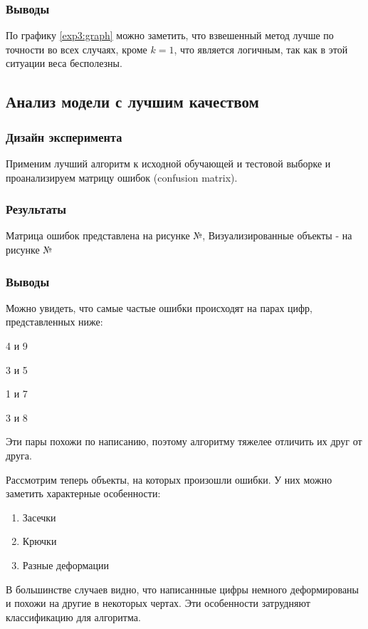 \documentclass[a4paper, 12pt]{article}
\begin{document}
    \subsubsection{Выводы}
    По графику \ref{exp3:graph} можно заметить, что взвешенный метод лучше по точности во всех случаях, кроме $k = 1$, что является логичным, так как в этой ситуации веса бесполезны.
    \subsection{Анализ модели с лучшим качеством}
    \subsubsection{Дизайн эксперимента}
    Применим лучший алгоритм к исходной обучающей и тестовой выборке и проанализируем матрицу ошибок (confusion matrix).
    \subsubsection{Результаты}
    Матрица ошибок представлена на рисунке №, Визуализированные объекты - на рисунке №
    \subsubsection{Выводы}
    Можно увидеть, что самые частые ошибки происходят на парах цифр, представленных ниже:
    \begin{itemize}
        \begin{multicols}{2}
            \item 4 и 9
            \item 3 и 5
            \item 1 и 7
            \item 3 и 8
        \end{multicols}
    \end{itemize}
    Эти пары похожи по написанию, поэтому алгоритму тяжелее отличить их друг от друга. 
    
    Рассмотрим теперь объекты, на которых произошли ошибки. У них можно заметить характерные особенности:
    \begin{enumerate}
        \item Засечки
        \item Крючки
        \item Разные деформации
    \end{enumerate}
    В большинстве случаев видно, что написаннные цифры немного деформированы и похожи на другие в некоторых чертах. Эти особенности затрудняют классификацию для алгоритма.
    \\
    
    
\end{document}
